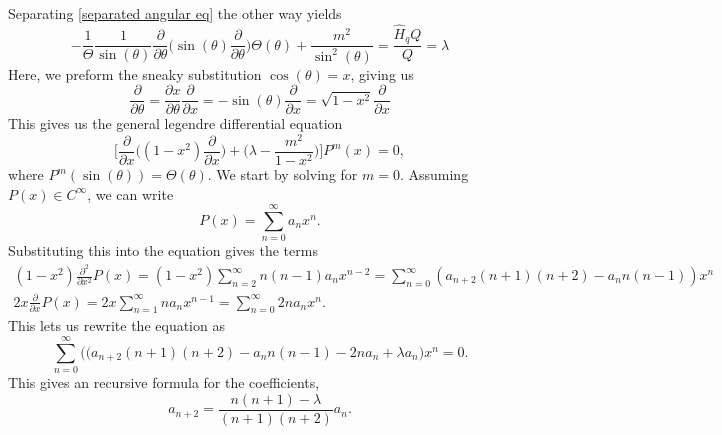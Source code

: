 \documentclass{article}
\begin{document}
        Separating \eqref{separated angular eq} the other way yields
        \begin{equation*}
            - \frac{1}{\Theta}\frac{1}{\sin(\theta)}\frac{\partial}{\partial \theta}\bigg( \sin(\theta)\frac{\partial}{\partial \theta}\bigg) \Theta(\theta) + \frac{m^2}{\sin^2(\theta)} = \frac{\hat H_q Q}{Q} = \lambda
        \end{equation*}
        Here, we preform the sneaky substitution \(\cos(\theta) = x\), giving us
        \begin{equation*}
            \frac{\partial}{\partial \theta} = \frac{\partial x}{\partial \theta} \frac{\partial}{\partial x} = -\sin(\theta) \frac{\partial}{\partial x} = \sqrt{1 - x^2} \frac{\partial}{\partial x}
        \end{equation*}
        This gives us the general legendre differential equation
        \begin{equation}
            \label{Legendre equation}
            \bigg[\frac{\partial}{\partial x} \bigg( (1 - x^2) \frac{\partial}{\partial x} \bigg)+ \bigg( \lambda  - \frac{m^2}{1 - x^2}\bigg) \bigg] P^m(x) = 0,
        \end{equation}
        where \(P^m(\sin(\theta)) = \Theta(\theta)\). We start by solving for \(m = 0\). Assuming \(P(x) \in C^\infty\), we can write 
        \begin{equation*}
            P(x) = \sum_{n = 0}^\infty a_n x^n.
        \end{equation*}
        Substituting this into the equation gives the terms
        \begin{align*}
            (1-x^2)\frac{\partial^2}{\partial x^2} P(x) = (1-x^2)\sum_{n=2}^\infty n (n - 1) a_nx^{n-2} = \sum_{n=0}^\infty (a_{n+2}(n + 1)(n+2) - a_n n (n - 1))x^n \\
            2x\frac{\partial}{\partial x}P(x) = 2x \sum_{n = 1}^\infty na_n x^{n - 1} = \sum_{n = 0}^\infty 2 n a_{n} x^{n}. 
        \end{align*} 
        This lets us rewrite the equation as
        \begin{equation*}
            \sum_{n=0}^\infty \big((a_{n+2}(n + 1)(n+2) - a_n n (n - 1) -2n a_{n} + \lambda a_n\big)x^n = 0.
        \end{equation*}
        This gives an recursive formula for the coefficients,
        \begin{equation*}
            a_{n + 2} = \frac{n(n + 1) - \lambda}{(n + 1)(n + 2)}a_n.
        \end{equation*}
\end{document}
